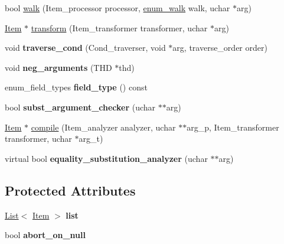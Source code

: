 \begin{DoxyCompactItemize}
\item 
bool \mbox{\hyperlink{classItem__cond_a6e601f5a22e1625a703c0183a67eca2a}{walk}} (Item\+\_\+processor processor, \mbox{\hyperlink{classItem_a4e68f315ba2a26543339e9f0efed3695}{enum\+\_\+walk}} walk, uchar $\ast$arg)
\item 
\mbox{\hyperlink{classItem}{Item}} $\ast$ \mbox{\hyperlink{classItem__cond_a43e1bfb20c36bd6daa98d1243ef807fa}{transform}} (Item\+\_\+transformer transformer, uchar $\ast$arg)
\item 
\mbox{\label{classItem__cond_a835595a1d23d2168a59b8376ac84fdc8}} 
void {\bfseries traverse\+\_\+cond} (Cond\+\_\+traverser, void $\ast$arg, traverse\+\_\+order order)
\item 
\mbox{\label{classItem__cond_a465b970593bebbd7251c4edff91fc8ef}} 
void {\bfseries neg\+\_\+arguments} (T\+HD $\ast$thd)
\item 
\mbox{\label{classItem__cond_a1b643bb46948b6da6b2ae127fcc63e3f}} 
enum\+\_\+field\+\_\+types {\bfseries field\+\_\+type} () const
\item 
\mbox{\label{classItem__cond_ac518b58db6dc82a7f928a62ecbbbc265}} 
bool {\bfseries subst\+\_\+argument\+\_\+checker} (uchar $\ast$$\ast$arg)
\item 
\mbox{\hyperlink{classItem}{Item}} $\ast$ \mbox{\hyperlink{classItem__cond_ae680c2ce1b3c4b5a381b590362513e37}{compile}} (Item\+\_\+analyzer analyzer, uchar $\ast$$\ast$arg\+\_\+p, Item\+\_\+transformer transformer, uchar $\ast$arg\+\_\+t)
\item 
\mbox{\label{classItem__cond_ab8c8bd19618e96f589f87a97b03bbd1e}} 
virtual bool {\bfseries equality\+\_\+substitution\+\_\+analyzer} (uchar $\ast$$\ast$arg)
\end{DoxyCompactItemize}
\subsection*{Protected Attributes}
\begin{DoxyCompactItemize}
\item 
\mbox{\label{classItem__cond_aaafb4e98d478d5386e9f9783004499bf}} 
\mbox{\hyperlink{classList}{List}}$<$ \mbox{\hyperlink{classItem}{Item}} $>$ {\bfseries list}
\item 
\mbox{\label{classItem__cond_ae026dff905780f8180a327fbfcf77de8}} 
bool {\bfseries abort\+\_\+on\+\_\+null}
\end{DoxyCompactItemize}

